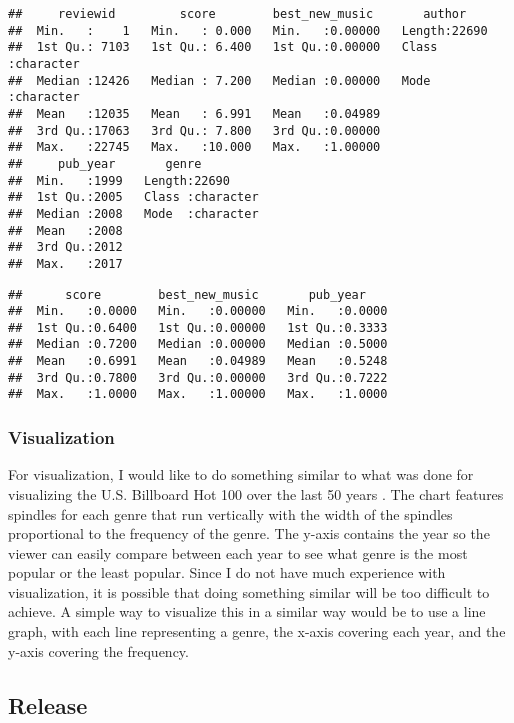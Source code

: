 \documentclass{article}
\begin{document}
\begin{verbatim}
##     reviewid         score        best_new_music       author         
##  Min.   :    1   Min.   : 0.000   Min.   :0.00000   Length:22690      
##  1st Qu.: 7103   1st Qu.: 6.400   1st Qu.:0.00000   Class :character  
##  Median :12426   Median : 7.200   Median :0.00000   Mode  :character  
##  Mean   :12035   Mean   : 6.991   Mean   :0.04989                     
##  3rd Qu.:17063   3rd Qu.: 7.800   3rd Qu.:0.00000                     
##  Max.   :22745   Max.   :10.000   Max.   :1.00000                     
##     pub_year       genre          
##  Min.   :1999   Length:22690      
##  1st Qu.:2005   Class :character  
##  Median :2008   Mode  :character  
##  Mean   :2008                     
##  3rd Qu.:2012                     
##  Max.   :2017
\end{verbatim}

\begin{verbatim}
##      score        best_new_music       pub_year     
##  Min.   :0.0000   Min.   :0.00000   Min.   :0.0000  
##  1st Qu.:0.6400   1st Qu.:0.00000   1st Qu.:0.3333  
##  Median :0.7200   Median :0.00000   Median :0.5000  
##  Mean   :0.6991   Mean   :0.04989   Mean   :0.5248  
##  3rd Qu.:0.7800   3rd Qu.:0.00000   3rd Qu.:0.7222  
##  Max.   :1.0000   Max.   :1.00000   Max.   :1.0000
\end{verbatim}

\hypertarget{visualization}{%
\subsubsection{Visualization}\label{visualization}}

For visualization, I would like to do something similar to what was done
for visualizing the U.S. Billboard Hot 100 over the last 50 years
\citep{BillboardFigure}. The chart features spindles for each genre that
run vertically with the width of the spindles proportional to the
frequency of the genre. The y-axis contains the year so the viewer can
easily compare between each year to see what genre is the most popular
or the least popular. Since I do not have much experience with
visualization, it is possible that doing something similar will be too
difficult to achieve. A simple way to visualize this in a similar way
would be to use a line graph, with each line representing a genre, the
x-axis covering each year, and the y-axis covering the frequency.

\hypertarget{release}{%
\subsection{Release}\label{release}}
\end{document}
